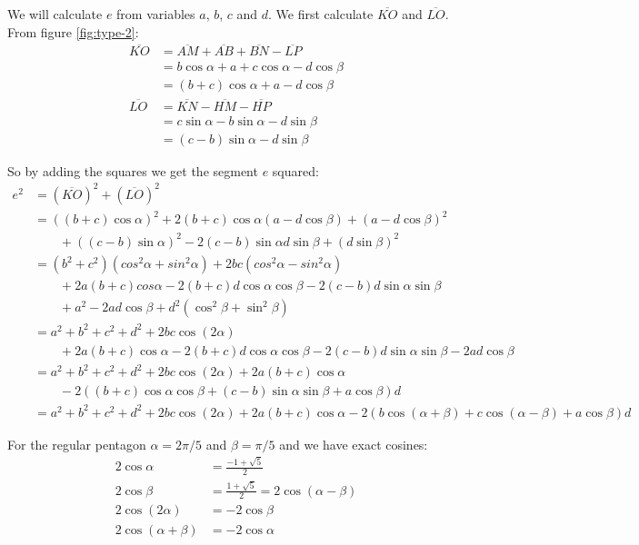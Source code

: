 \documentclass[11pt]{article}
\begin{document}
We will calculate $e$ from variables $a$, $b$, $c$ and $d$. We first calculate 
$\overline{KO}$ and $\overline{LO}$. From figure \ref{fig:type-2}:
\begin{align}
\overline{KO} &= \overline{AM} + \overline{AB} + \overline{BN} - \overline{LP} \nonumber\\
              &= b\cos{\alpha} + a + c\cos{\alpha} - d\cos{\beta} \nonumber\\
              &= (b+c)\cos{\alpha} + a  - d\cos{\beta}\\
\overline{LO} &= \overline{KN} - \overline{HM} - \overline{HP} \nonumber\\
              &= c\sin{\alpha} - b\sin{\alpha} - d\sin{\beta} \nonumber\\
              &= (c-b)\sin{\alpha} - d\sin{\beta}
\end{align}

So by adding the squares we get the segment $e$ squared:
\begin{align}
e^2 &= (\overline{KO})^2 + (\overline{LO})^2 \nonumber\\
 &= ((b+c)\cos{\alpha})^2 + 2(b+c)\cos{\alpha}(a - d\cos{\beta}) + (a - d\cos{\beta})^2 \nonumber\\
  &\qquad + ((c-b)\sin{\alpha})^2 - 2(c-b)\sin{\alpha}d\sin{\beta} + (d\sin{\beta})^2 \nonumber\\
 &= (b^2+c^2)(cos^2{\alpha}+sin^2{\alpha}) + 2bc(cos^2{\alpha}-sin^2{\alpha}) \nonumber\\
  &\qquad + 2a(b+c)cos{\alpha} - 2(b+c)d\cos{\alpha}\cos{\beta} - 2(c-b)d\sin{\alpha}\sin{\beta} \nonumber\\
  &\qquad + a^2 - 2ad\cos{\beta} + d^2(\cos^2{\beta} + \sin^2{\beta}) \nonumber\\
 &= a^2+b^2+c^2+d^2 + 2bc\cos{(2\alpha)} \nonumber\\
  &\qquad + 2a(b+c)\cos{\alpha} - 2(b+c)d\cos{\alpha}\cos{\beta} - 2(c-b)d\sin{\alpha}\sin{\beta} - 2ad\cos{\beta} \nonumber\\
 &= a^2+b^2+c^2+d^2 + 2bc\cos{(2\alpha)} + 2a(b+c)\cos{\alpha} \nonumber\\
  &\qquad- 2((b+c)\cos{\alpha}\cos{\beta} + (c-b)\sin{\alpha}\sin{\beta} +a\cos{\beta})d \nonumber\\
 &= \boxed{a^2+b^2+c^2+d^2 + 2bc\cos{(2\alpha)} + 2a(b+c)\cos{\alpha} - 2(b\cos{(\alpha+\beta)} + c\cos{(\alpha-\beta)} +a\cos{\beta})d} \end{align}

For the regular pentagon $\alpha = 2\pi/5$ and $\beta = \pi/5$ and we have exact cosines:
\begin{align}
2\cos{\alpha} &= \frac{-1+\sqrt{5}}{2} \\
2\cos{\beta} &= \frac{1+\sqrt{5}}{2} = 2\cos{(\alpha-\beta)} \\
2\cos{(2\alpha)} &= -2\cos{\beta} \\
2\cos{(\alpha+\beta)} &= -2\cos{\alpha}
\end{align}
\end{document}
